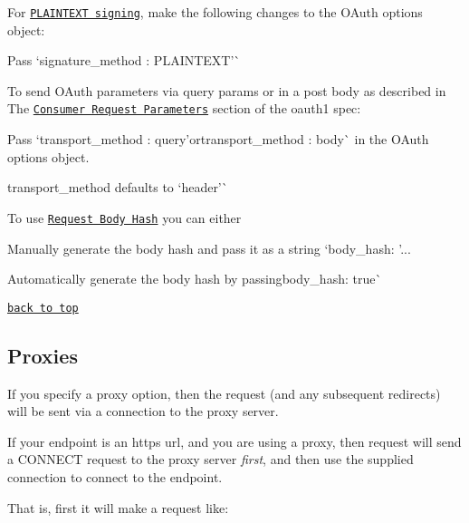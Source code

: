 For \href{http://oauth.net/core/1.0/#anchor22}{\tt P\+L\+A\+I\+N\+T\+E\+XT signing}, make the following changes to the O\+Auth options object\+:
\begin{DoxyItemize}
\item Pass `signature\+\_\+method \+: \textquotesingle{}P\+L\+A\+I\+N\+T\+E\+XT'\`{}
\end{DoxyItemize}

To send O\+Auth parameters via query params or in a post body as described in The \href{http://oauth.net/core/1.0/#consumer_req_param}{\tt Consumer Request Parameters} section of the oauth1 spec\+:
\begin{DoxyItemize}
\item Pass `transport\+\_\+method \+: \textquotesingle{}query'{\ttfamily or}transport\+\_\+method \+: \textquotesingle{}body\textquotesingle{}\`{} in the O\+Auth options object.
\item {\ttfamily transport\+\_\+method} defaults to `\textquotesingle{}header'\`{}
\end{DoxyItemize}

To use \href{https://oauth.googlecode.com/svn/spec/ext/body_hash/1.0/oauth-bodyhash.html}{\tt Request Body Hash} you can either
\begin{DoxyItemize}
\item Manually generate the body hash and pass it as a string `body\+\_\+hash\+: '...\textquotesingle{}{\ttfamily }
\item {\ttfamily Automatically generate the body hash by passing}body\+\_\+hash\+: true\`{}
\end{DoxyItemize}

\href{#table-of-contents}{\tt back to top}





\subsection*{Proxies}

If you specify a {\ttfamily proxy} option, then the request (and any subsequent redirects) will be sent via a connection to the proxy server.

If your endpoint is an {\ttfamily https} url, and you are using a proxy, then request will send a {\ttfamily C\+O\+N\+N\+E\+CT} request to the proxy server {\itshape first}, and then use the supplied connection to connect to the endpoint.

That is, first it will make a request like\+:


